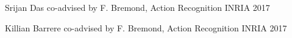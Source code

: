 



\begin{cvhonors}

  \cvhonor
    {Srijan Das} %
    {co-advised by F. Bremond, Action Recognition \cite{Das:2017}} %
    {INRIA} %
    {2017} %

  \cvhonor
    {Killian Barrere} %
    {co-advised by F. Bremond, Action Recognition} %
    {INRIA} %
    {2017} %


\end{cvhonors}
